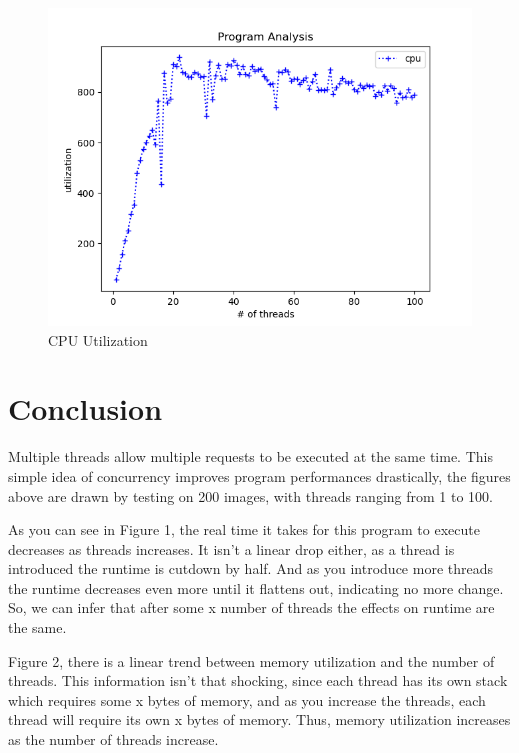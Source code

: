 \documentclass[11pt, titlepage]{article}
\begin{document}
\begin{figure}[h]
    \includegraphics[height=0.3\textheight]{cpu_util.png}
    \caption{CPU Utilization}
  \end{figure}

  \clearpage
  \section*{Conclusion}
  Multiple threads allow multiple requests to be executed at the same time. This simple idea of concurrency improves
  program performances drastically, the figures above are drawn by testing on 200 images, with threads ranging from 1 to 100.
  
  As you can see in Figure 1, the real time it takes for this program to execute decreases as threads increases.
  It isn't a linear drop either, as a thread is introduced the runtime is cutdown by half. And as you introduce
  more threads the runtime decreases even more until it flattens out, indicating no more change. So, we can infer
  that after some x number of threads the effects on runtime are the same.

  Figure 2, there is a linear trend between memory utilization and the number of threads. This information isn't that shocking,
  since each thread has its own stack which requires some x bytes of memory, and as you increase the threads, each thread will
  require its own x bytes of memory. Thus, memory utilization increases as the number of threads increase.
\end{document}
